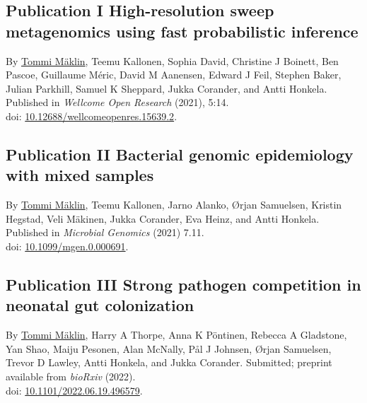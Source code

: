 \documentclass[officiallayout]{tktla}
\begin{document}
\subsection*{Publication I \textemdash{ } High-resolution sweep metagenomics using fast probabilistic inference}
By \underline{Tommi M\"aklin}, Teemu Kallonen, Sophia David, Christine
J Boinett, Ben Pascoe, Guillaume M\'eric, David M Aanensen, Edward J
Feil, Stephen Baker, Julian Parkhill, Samuel K Sheppard, Jukka
Corander, and Antti Honkela. Published in \textit{Wellcome Open
  Research} (2021), 5:14. \\doi:
\href{https://doi.org/10.12688/wellcomeopenres.15639.2}{10.12688/wellcomeopenres.15639.2}.
\subsection*{Publication II \textemdash{ } Bacterial genomic epidemiology with mixed samples}
By \underline{Tommi M\"aklin}, Teemu Kallonen, Jarno Alanko, \O rjan
Samuelsen, Kristin Hegstad, Veli M\"akinen, Jukka Corander, Eva Heinz,
and Antti Honkela. Published in \textit{Microbial Genomics} (2021)
7.11. \\doi:
\href{https://doi.org/10.1099/mgen.0.000691}{10.1099/mgen.0.000691}.

\subsection*{Publication III \textemdash{ } Strong pathogen competition in neonatal gut colonization}
By \underline{Tommi M\"aklin}, Harry A Thorpe, Anna K P\"ontinen,
Rebecca A Gladstone, Yan Shao, Maiju Pesonen, Alan McNally, P\aa l J
Johnsen, \O rjan Samuelsen, Trevor D Lawley, Antti Honkela, and Jukka
Corander. Submitted; preprint available from \textit{bioRxiv}
(2022). \\doi:
\href{https://doi.org/10.1101/2022.06.19.496579}{10.1101/2022.06.19.496579}.




\end{document}
